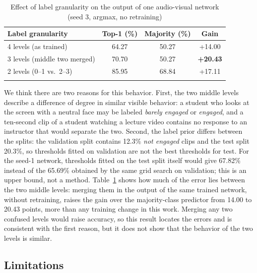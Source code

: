\documentclass[pdflatex,iicol,sn-basic]{sn-jnl}
\begin{document}
\begin{table}[t]
\caption{Effect of label granularity on the output of one audio-visual network (seed 3, argmax, no retraining)}\label{tab:granularity}
\begin{tabular*}{\textwidth}{@{\extracolsep\fill}lccc}
\toprule
Label granularity & Top-1 (\%) & Majority (\%) & Gain\\
\midrule
4 levels (as trained) & 64.27 & 50.27 & +14.00\\
3 levels (middle two merged) & 70.70 & 50.27 & \textbf{+20.43}\\
2 levels (0--1 vs.\ 2--3) & 85.95 & 68.84 & +17.11\\
\botrule
\end{tabular*}
\end{table}

We think there are two reasons for this behavior. First, the two middle levels describe a difference of degree in similar visible behavior: a student who looks at the screen with a neutral face may be labeled \emph{barely engaged} or \emph{engaged}, and a ten-second clip of a student watching a lecture video contains no response to an instructor that would separate the two. Second, the label prior differs between the splits: the validation split contains 12.3\% \emph{not engaged} clips and the test split 20.3\%, so thresholds fitted on validation are not the best thresholds for test. For the seed-1 network, thresholds fitted on the test split itself would give 67.82\% instead of the 65.69\% obtained by the same grid search on validation; this is an upper bound, not a method. Table~\ref{tab:granularity} shows how much of the error lies between the two middle levels: merging them in the output of the same trained network, without retraining, raises the gain over the majority-class predictor from 14.00 to 20.43 points, more than any training change in this work. Merging any two confused levels would raise accuracy, so this result locates the errors and is consistent with the first reason, but it does not show that the behavior of the two levels is similar.

\subsection{Limitations}\label{sec:limitations}
\end{document}

